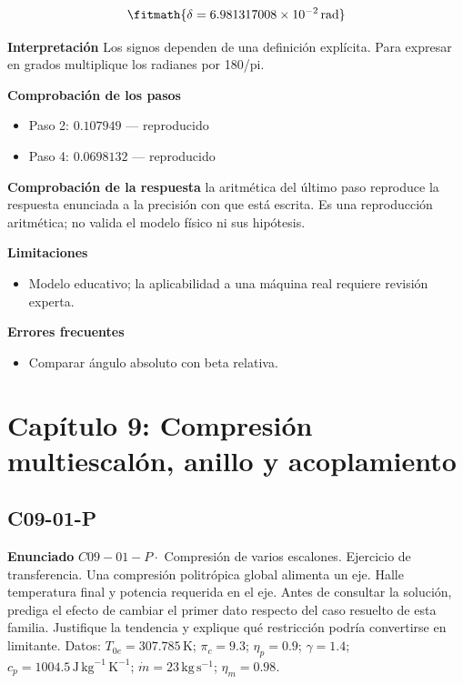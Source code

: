 \documentclass[10pt,openany]{book}
\begin{document}
\[
\fitmath{\delta=6.981317008\times10^{-2}\,\mathrm{rad}}
\]

\noindent\textbf{Interpretación}
Los signos dependen de una definición explícita. Para expresar en grados multiplique los radianes por 180/pi.

\noindent\textbf{Comprobación de los pasos}
\begin{itemize}
\item Paso 2: $0.107949$ — reproducido
\item Paso 4: $0.0698132$ — reproducido
\end{itemize}

\noindent\textbf{Comprobación de la respuesta} la aritmética del último paso reproduce la respuesta enunciada a la precisión con que está escrita. Es una reproducción aritmética; no valida el modelo físico ni sus hipótesis.

\noindent\textbf{Limitaciones}
\begin{itemize}
\item Modelo educativo; la aplicabilidad a una máquina real requiere revisión experta.
\end{itemize}

\noindent\textbf{Errores frecuentes}
\begin{itemize}
\item Comparar ángulo absoluto con beta relativa.
\end{itemize}
\section{Capítulo 9: Compresión multiescalón, anillo y acoplamiento}
\subsection*{C09-01-P}

\noindent\textbf{Enunciado}
\(C09-01-P \cdot\) Compresión de varios escalones. Ejercicio de transferencia. Una compresión politrópica global alimenta un eje. Halle temperatura final y potencia requerida en el eje. Antes de consultar la solución, prediga el efecto de cambiar el primer dato respecto del caso resuelto de esta familia. Justifique la tendencia y explique qué restricción podría convertirse en limitante. Datos: \(T_{0e}=307.785\, \mathrm{K}\); \(\pi_c=9.3\); \(\eta_p=0.9\); \(\gamma=1.4\); \(c_p=1004.5\, \mathrm{J}\,\mathrm{kg}^{-1}\,\mathrm{K}^{-1}\); \(\dot m=23\, \mathrm{kg}\,\mathrm{s}^{-1}\); \(\eta_m=0.98\).
\end{document}
